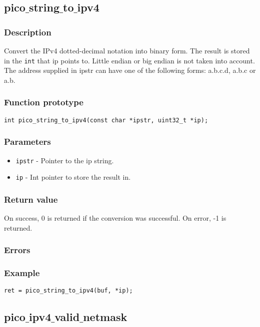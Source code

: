 \subsection{pico$\_$string$\_$to$\_$ipv4}

\subsubsection*{Description}
Convert the IPv4 dotted-decimal notation into binary form. The result is stored in the
\texttt{int} that ip points to. Little endian or big endian is not taken into account.
The address supplied in ipstr can have one of the following forms: a.b.c.d, a.b.c or a.b.

\subsubsection*{Function prototype}
\begin{verbatim}
int pico_string_to_ipv4(const char *ipstr, uint32_t *ip); 
\end{verbatim}

\subsubsection*{Parameters}
\begin{itemize}
\item \texttt{ipstr} - Pointer to the ip string.
\item \texttt{ip} - Int pointer to store the result in.
\end{itemize}

\subsubsection*{Return value}
On success, 0 is returned if the conversion was successful.
On error, -1 is returned.

\subsubsection*{Errors}

\subsubsection*{Example}
\begin{verbatim}
ret = pico_string_to_ipv4(buf, *ip);
\end{verbatim}


\subsection{pico$\_$ipv4$\_$valid$\_$netmask}

